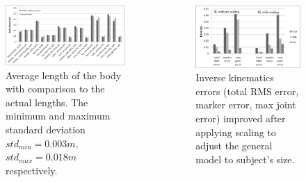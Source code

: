 \documentclass[final]{beamer}
\newlength{\onecolwid}
\newlength{\twocolwid}
\begin{document}
\begin{frame}[t]
\begin{columns}[t]
\begin{column}{\twocolwid}

\begin{columns}[t,totalwidth=\twocolwid] %
	
	\begin{column}{\onecolwid}\vspace{-1in}
		
		\begin{figure}[!t]
			\centering
			\includegraphics[width=0.95\linewidth, keepaspectratio]{fig/subject01-segments.png}
			\caption{Average length of the body with comparison to the actual lengths. The minimum and maximum standard deviation $std_{min} = 0.003m$, $std_{max} = 0.018m$ respectively.}
			\label{fig:kinect-mesurment}
		\end{figure}
		
	\end{column} %
	
	\begin{column}{\onecolwid}\vspace{-1in} %
		
		\begin{figure}[!t]
			\centering
			\includegraphics[width=0.8\linewidth, keepaspectratio]{fig/ik-no-scale-with-scale.png}
			\caption{Inverse kinematics errors (total RMS error, marker error, max joint error) improved after applying scaling to adjust the general model to subject's size.}
			\label{fig:ik-error}
		\end{figure}
		

\end{column}
\end{columns}
\end{column}
\end{columns}
\end{frame}
\end{document}
